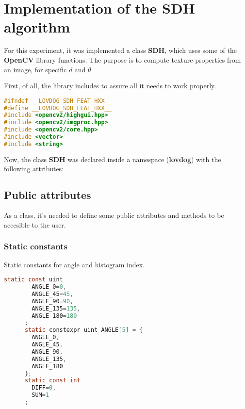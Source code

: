 \section{ Implementation of the SDH algorithm}


For this experiment, it was implemented a class \textbf{SDH},
which uses some of the \textbf{OpenCV} library functions.
The purpose is to compute texture properties from an image,
for specific $d$ and $\theta$ 

First, of all, the library includes to assure all it needs to
work properly.

\begin{file}
  \begin{lstlisting}[language=C]
#ifndef __LOVDOG_SDH_FEAT_HXX__
#define __LOVDOG_SDH_FEAT_HXX__
#include <opencv2/highgui.hpp>
#include <opencv2/imgproc.hpp>
#include <opencv2/core.hpp>
#include <vector>
#include <string>
  \end{lstlisting}
\end{file}

Now, the class \textbf{SDH} was declared inside a namespace
(\textbf{lovdog}) with the following attributes:

\subsection{Public attributes}
As a class, it's needed to define some public attributes and
methods to be accesible to the user.

\subsubsection{Static constants}
Static constants for angle and histogram index.
\begin{file}
  \begin{lstlisting}[language=C]
      static const uint
        ANGLE_0=0,
        ANGLE_45=45,
        ANGLE_90=90,
        ANGLE_135=135,
        ANGLE_180=180
      ;
      static constexpr uint ANGLE[5] = {
        ANGLE_0,
        ANGLE_45,
        ANGLE_90,
        ANGLE_135,
        ANGLE_180
      };
      static const int
        DIFF=0,
        SUM=1
      ;
  \end{lstlisting}
\end{file}

